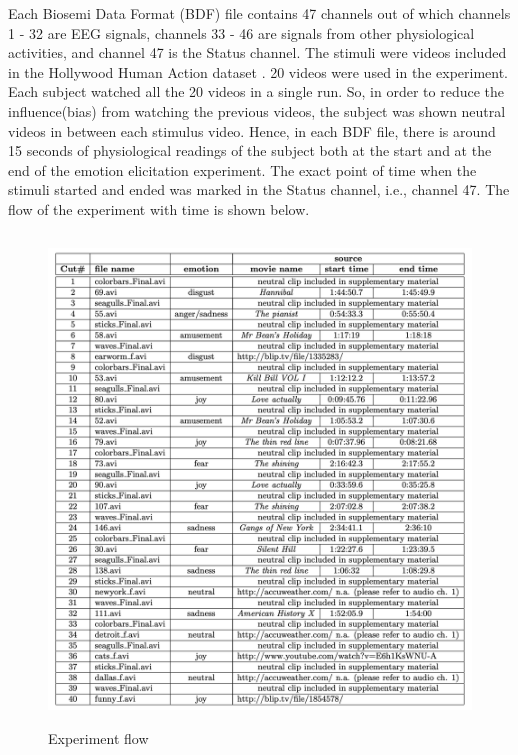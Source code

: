 Each Biosemi Data Format (BDF) file contains 47 channels out of which channels 1 - 32 are EEG signals, channels 33 - 46 are signals from other physiological activities, and channel 47 is the Status channel. The stimuli were videos included in the Hollywood Human Action dataset \cite{holly}. 20 videos were used in the experiment. Each subject watched all the 20 videos in a single run. So, in order to reduce the influence(bias) from watching the previous videos, the subject was shown neutral videos in between each stimulus video. Hence, in each BDF file, there is around 15 seconds of physiological readings of the subject both at the start and at the end of the emotion elicitation experiment. The exact point of time when the stimuli started and ended was marked in the Status channel, i.e., channel 47. The flow of the experiment with time is shown below.

\begin{figure}[H]
\centering
\includegraphics[height=13cm]{Figures/experiment_flow.png}
\caption{Experiment flow}
\label{fig22}
\end{figure}
